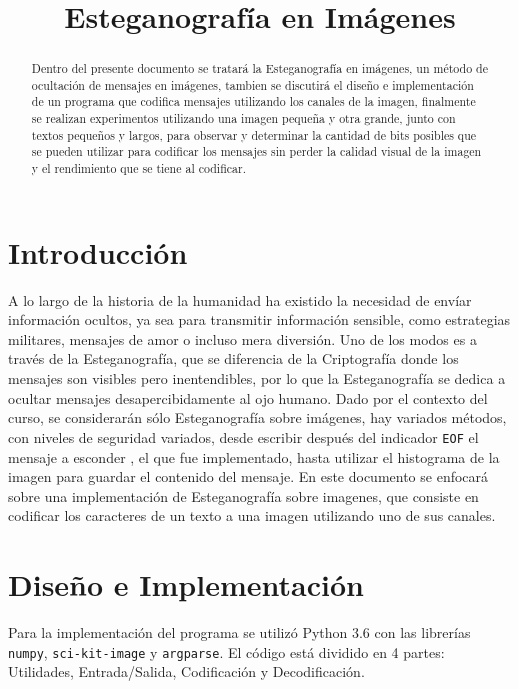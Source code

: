 \documentclass[conference]{IEEEtran}
\begin{document}
\title{Esteganografía en Imágenes}
\author{
}


\maketitle

\begin{abstract}
    Dentro del presente documento se tratará la Esteganografía en imágenes, un método de ocultación de mensajes en imágenes, tambien se discutirá el diseño e implementación de un programa que codifica mensajes utilizando los canales de la imagen, finalmente se realizan experimentos utilizando una imagen pequeña y otra grande, junto con textos pequeños y largos, para observar y determinar la cantidad de bits posibles que se pueden utilizar para codificar los mensajes sin perder la calidad visual de la imagen y el rendimiento que se tiene al codificar.
\end{abstract}
 

\section*{Introducción} %
    A lo largo de la historia de la humanidad ha existido la necesidad de envíar información ocultos, ya sea para transmitir información sensible, como estrategias militares, mensajes de amor o incluso mera diversión.
    Uno de los modos es a través de la Esteganografía, que se diferencia de la Criptografía donde los mensajes son visibles pero inentendibles, por lo que la Esteganografía se dedica a ocultar mensajes desapercibidamente al ojo humano.
    Dado por el contexto del curso, se considerarán sólo Esteganografía sobre imágenes, hay variados métodos, con niveles de seguridad variados, desde escribir después del indicador \texttt{EOF} el mensaje a esconder \cite{DIS}, el que fue implementado, hasta utilizar el histograma de la imagen para guardar el contenido del mensaje.
    En este documento se enfocará sobre una implementación de Esteganografía sobre imagenes, que consiste en codificar los caracteres de un texto a una imagen utilizando uno de sus canales.
    
\section*{Diseño e Implementación}
	Para la implementación del programa se utilizó Python 3.6 con las librerías \texttt{numpy}, \texttt{sci-kit-image} y \texttt{argparse}. El código está dividido en 4 partes: Utilidades, Entrada/Salida, Codificación y Decodificación.
\end{document}

